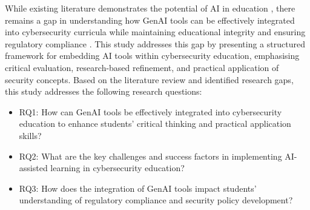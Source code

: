 While existing literature demonstrates the potential of AI in education \cite{10837597,10837608,10837679}, there remains a gap in understanding how GenAI tools can be effectively integrated into cybersecurity curricula while maintaining educational integrity and ensuring regulatory compliance \cite{sandu2024role}. This study addresses this gap by presenting a structured framework for embedding AI tools within cybersecurity education, emphasising critical evaluation, research-based refinement, and practical application of security concepts.
Based on the literature review and identified research gaps, this study addresses the following research questions:
\begin{itemize}
    \item RQ1: How can GenAI tools be effectively integrated into cybersecurity education to enhance students' critical thinking and practical application skills?
    \item RQ2: What are the key challenges and success factors in implementing AI-assisted learning in cybersecurity education?
    \item RQ3: How does the integration of GenAI tools impact students' understanding of regulatory compliance and security policy development?
\end{itemize}


